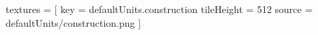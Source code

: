 textures = [
    {
        key         = defaultUnits.construction
        tileHeight  = 512
        source      = defaultUnits/construction.png
    }
]